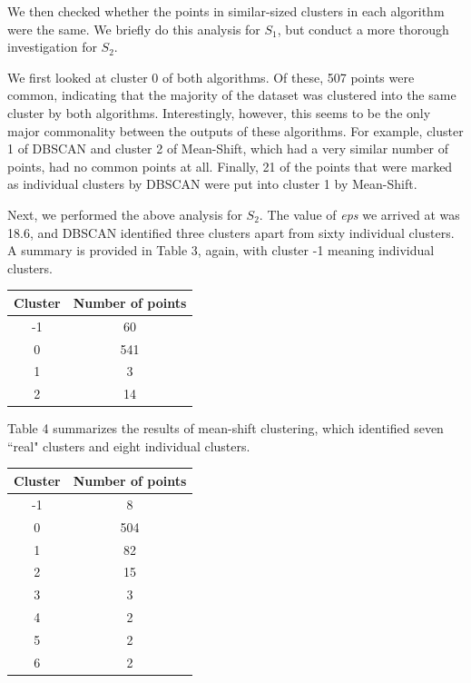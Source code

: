\documentclass[12pt,a4paper,twocolumn]{article}
\begin{document}
	We then checked whether the points in similar-sized clusters in each algorithm were the same. We briefly do this analysis for $S_1$, but conduct a more thorough investigation for $S_2$.
	
	We first looked at cluster 0 of both algorithms. Of these, 507 points were common, indicating that the majority of the dataset was clustered into the same cluster by both algorithms. Interestingly, however, this seems to be the only major commonality between the outputs of these algorithms. For example, cluster 1 of DBSCAN and cluster 2 of Mean-Shift, which had a very similar number of points, had no common points at all. Finally, 21 of the points that were marked as individual clusters by DBSCAN were put into cluster 1 by Mean-Shift.
	
	Next, we performed the above analysis for $S_2$. The value of \textit{eps} we arrived at was 18.6, and DBSCAN identified three clusters apart from sixty individual clusters. A summary is provided in Table 3, again, with cluster -1 meaning individual clusters.\\
	
	\begin{tabular}{|c|c|}
		\hline 
		\textbf{Cluster} & \textbf{Number of points} \\ 
		\hline 
		-1 & 60 \\ 
		\hline 
		0 & 541 \\ 
		\hline 
		1 & 3 \\ 
		\hline 
		2 & 14 \\ 
		\hline 
	\end{tabular} 
	\begingroup
	\endgroup
	\hfill\break
	
	Table 4 summarizes the results of mean-shift clustering, which identified seven ``real" clusters and eight individual clusters.\\
	
	\begin{tabular}{|c|c|}
		\hline 
		\textbf{Cluster} & \textbf{Number of points} \\ 
		\hline 
		-1 & 8 \\ 
		\hline 
		0 & 504 \\ 
		\hline 
		1 & 82 \\ 
		\hline 
		2 & 15 \\ 
		\hline 
		3 & 3 \\ 
		\hline 
		4 & 2 \\ 
		\hline 
		5 & 2 \\ 
		\hline 
		6 & 2 \\ 
		\hline 
	\end{tabular} 
	\begingroup
	\endgroup
	\hfill\break
	
\end{document}
